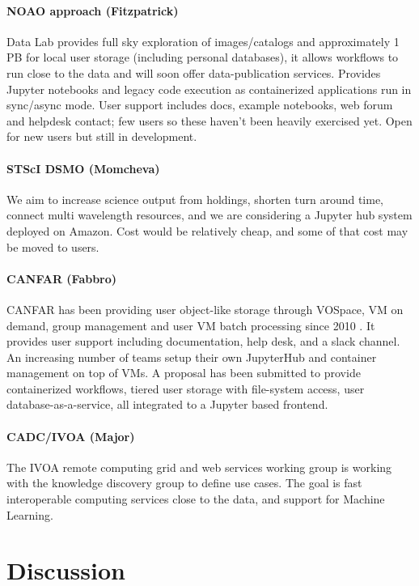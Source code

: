 \documentclass[11pt,twoside]{article}
\begin{document}
\paragraph*{NOAO approach (Fitzpatrick)} Data Lab \citep{2016SPIE.9913E..0LF} provides full sky exploration of images/catalogs and approximately 1 PB for local user storage (including personal databases), it allows workflows to run close to the data and will soon offer data-publication services. Provides Jupyter notebooks and legacy code execution as containerized applications run in sync/async mode. User support includes docs, example notebooks, web forum and helpdesk contact; few users so these haven't been heavily exercised yet.  Open for new users but still in development.


\paragraph*{STScI DSMO (Momcheva)} We aim to increase science output from holdings, shorten turn around time, connect multi wavelength resources, and we are considering a Jupyter hub system deployed on Amazon. Cost would be relatively cheap, and some of that cost may be moved to users.

\paragraph*{CANFAR (Fabbro)} CANFAR has been providing user object-like storage through VOSpace, VM on demand, group management and user VM batch processing since 2010 \citep{2010SPIE.7740E..1IG}. It provides user support including documentation, help desk, and a slack channel. An increasing number of teams setup their own JupyterHub and container management on top of VMs. A proposal has been submitted to provide containerized workflows, tiered user storage with file-system access, user database-as-a-service, all integrated to a Jupyter based frontend.

\paragraph*{CADC/IVOA (Major)} The IVOA remote computing grid and web services working group is working with the knowledge discovery group to define use cases.
The goal is fast interoperable computing services close to the data, and support for Machine Learning.

\section{Discussion}
\end{document}
